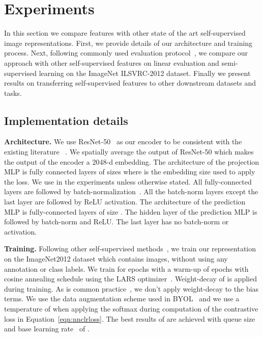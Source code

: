 \section{Experiments}

In this section we compare \methodname features with other state of the art self-supervised image representations. First, we provide details of our architecture and training process. Next, following commonly used evaluation protocol~\cite{grill2020bootstrap,chen2020simple,chen2020big,he2020momentum},
we compare our approach with other self-supervised features on linear evaluation and semi-supervised learning on the ImageNet ILSVRC-2012 dataset. Finally we present results on transferring self-supervised features to other downstream datasets and tasks. 



\subsection{Implementation details}

\noindent\textbf{Architecture.} We use ResNet-50~\cite{he2016deep} as our encoder to be consistent with the existing literature ~\cite{grill2020bootstrap,chen2020simple}.
We spatially average the output of ResNet-50 which makes the output of the encoder a 2048-d embedding. The architecture of the projection MLP is  fully connected layers of sizes  where  is the embedding size used to apply the loss. We use  in the experiments unless otherwise stated. All fully-connected layers are followed by  batch-normalization~\cite{ioffe2015batch}. All the batch-norm layers except the last layer are followed by ReLU activation. The architecture of the prediction MLP  is  fully-connected layers of size .  The hidden layer of the prediction MLP is followed by batch-norm and ReLU. The last layer has no batch-norm or activation.


\noindent\textbf{Training.} Following other self-supervised methods~\cite{grill2020bootstrap,chen2020simple,chen2020big,he2020momentum}, we train our \methodname representation on the ImageNet2012 dataset which contains  images, without using any annotation or class labels. We train for  epochs with a warm-up of  epochs with cosine annealing schedule using the LARS optimizer~\cite{you2017large}. Weight-decay of  is applied during training. As is common practice~\cite{grill2020bootstrap,chen2020big}, we don't apply weight-decay to the bias terms. We use the data augmentation scheme used in BYOL~\cite{grill2020bootstrap} and we use a temperature  of  when applying the softmax during computation of the contrastive loss in Equation~\ref{eqn:nnclrloss}. The best results of \methodname are achieved with  queue size and base learning rate~\cite{grill2020bootstrap} of .


